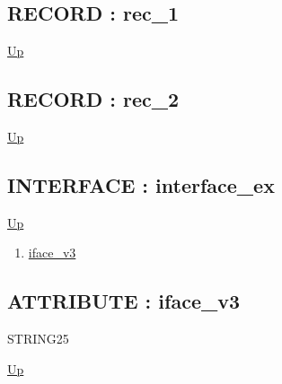 \subsection*{RECORD : rec\_1}
\hypertarget{ecldoc:example.rec_1}{}
\par
\begin{minipage}[t]{\textwidth}
\begin{flushleft}
  
\end{flushleft}
\end{minipage}
\hyperlink{ecldoc:example}{Up} \\
\par
\par
\subsection*{RECORD : rec\_2}
\hypertarget{ecldoc:example.rec_2}{}
\par
\begin{minipage}[t]{\textwidth}
\begin{flushleft}
  
\end{flushleft}
\end{minipage}
\hyperlink{ecldoc:example}{Up} \\
\par
\par
\subsection*{INTERFACE : interface\_ex}
\hypertarget{ecldoc:example.interface_ex}{}
\par
\begin{minipage}[t]{\textwidth}
\begin{flushleft}
  
\end{flushleft}
\end{minipage}
\hyperlink{ecldoc:example}{Up} \\
\par
\par
\begin{enumerate}
\item \hyperlink{ecldoc:example.interface_ex.iface_v3}{iface\_v3}
\end{enumerate}
\subsection*{ATTRIBUTE : iface\_v3}
\hypertarget{ecldoc:example.interface_ex.iface_v3}{}
\par
\begin{minipage}[t]{\textwidth}
\begin{flushleft}
STRING25  
\end{flushleft}
\end{minipage}
\hyperlink{ecldoc:example.interface_ex}{Up} \\
\par
\par

